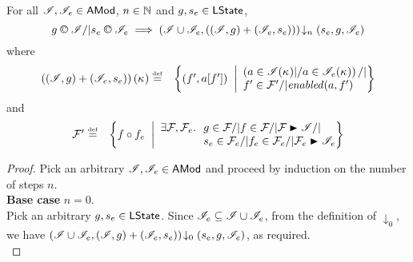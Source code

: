 %
%
%
\begin{lemma}\label{lem:extend-closure}
%
For all $\mathscr{I}{}, \mathscr{I}_{e} \in \textsf{AMod}$, $n \in \mathbb{N}$ and $g, s_e \in \textsf{LState}$,
\[
	g \confines \lmod /| s_e \confines \lmod_{e} 
	\implies
	\extendsAMUpto{\lmod \cup \lmod_{e}, \left( (\lmod, g) + (\lmod_{e}, s_e) \right)}{n}{s_{e}}{g}{\lmod_{e}}
\]
%
where
%
\[
\begin{array}{@{} l  l @{}}
	\left( (\lmod, g) + (\lmod_{e}, s_e) \right)(\ca{}) \eqdef  & 
	\left\{
		(f', a[f']) \;\;\middle|
		\begin{array}{ l @{}}
			\left(a \in \lmod(\ca{}) |/ a \in \lmod_{e}(\ca{})  \right) /| \\
			f' \in \fence{}' /| \m{enabled}(a, f')	
		\end{array}		  
	\right\}\\
\end{array}
\]
%
and
%
\[
\begin{array}{@{} l l @{}}
	\fence{}' \eqdef & 
	\left\{
		f \composeL f_{e} \;\;\middle| 
		\begin{array}{l @{\hspace{5pt}} l @{}}
			\exsts{\fence{}, \fence{e}} & g \in \fence{} /| f \in \fence{} /| \fence{} \strictfences \lmod /| \\
			& s_{e} \in \fence{e} /| f_{e} \in \fence{e} /| \fence{e} \strictfences \lmod_{e} 
		\end{array}
	\right\}
\end{array}
\]
%
\begin{proof}
Pick an arbitrary $\mathscr{I}, \mathscr{I}_{e} \in \textsf{AMod}$ and proceed by induction on the number of steps $n$. \\

\noindent\textbf{Base case }$n = 0$.\\
Pick an arbitrary $g, s_e \in \textsf{LState}$. Since $\mathscr{I}_{e} \subseteq \mathscr{I} \cup \mathscr{I}_{e}$, from the definition of $\downarrow_{0}$, we have $\left(\mathscr{I} \cup \mathscr{I}_{e}, (\mathscr{I}, g) + (\mathscr{I}_{e}, s_e)\right) \!\downarrow_{0} \left(s_{e}, g, \mathscr{I}_{e}\right)$, as required.\\


\end{proof}
\end{lemma}
